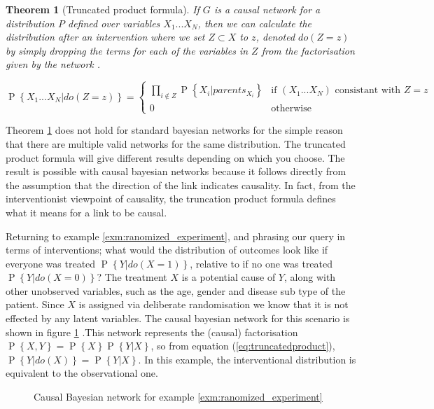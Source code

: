 \documentclass[11pt,a4paper,oneside]{book}
\renewcommand{\P}[1]{\operatorname{P}\left\{#1\right\}}
\theoremstyle{plain}
\newtheorem{theorem}{Theorem}
\theoremstyle{definition}
\begin{document}
\begin{theorem}[Truncated product formula]
\label{thm:truncated_prodcut}
If $G$ is a causal network for a distribution $P$ defined over variables $X_{1}...X_{N}$, then we can calculate the distribution after an intervention where we set $Z \subset X$ to $z$, denoted $do(Z=z)$ by simply dropping the terms for each of the variables in $Z$ from the factorisation given by the network \citep{Pearl2000}. 

\begin{equation}
\label{eq:truncatedproduct}
\P{X_1...X_N|do(Z=z)} =
  \begin{cases}
  \prod_{i \notin Z}\P{X_{i}|parents_{X_{i}}} & \text{if $(X_{1}...X_{N})$ consistant with $Z=z$}  \\
   0       & \text{otherwise } 
  \end{cases}
\end{equation}
\end{theorem}


Theorem \ref{thm:truncated_prodcut} does not hold for standard bayesian networks for the simple reason that there are multiple valid networks for the same distribution. The truncated product formula will give different results depending on which you choose. The result is possible with causal bayesian networks because it follows directly from the assumption that the direction of the link indicates causality. In fact, from the interventionist viewpoint of causality, the truncation product formula defines what it means for a link to be causal. 


Returning to example \ref{exm:ranomized_experiment}, and phrasing our query in terms of interventions; what would the distribution of outcomes look like if everyone was treated $\P{Y|do(X=1)}$, relative to if no one was treated $\P{Y|do(X=0)}$? The treatment $X$ is a potential cause of $Y$, along with other unobserved variables, such as the age, gender and disease sub type of the patient. Since $X$ is assigned  via deliberate randomisation we know that it is not effected by any latent variables. The causal bayesian network for this scenario is shown in figure \ref{fig:causal_network_example} .This network represents the (causal) factorisation  $\P{X,Y} = \P{X}\P{Y|X}$, so from equation (\ref{eq:truncatedproduct}), $\P{Y|do(X)} = \P{Y|X}$. In this example, the interventional distribution is equivalent to the observational one.

\begin{figure}[h]
\caption{Causal Bayesian network for example \ref{exm:ranomized_experiment}}
\label{fig:causal_network_example}
\centering
{}
\end{figure}
\end{document}
